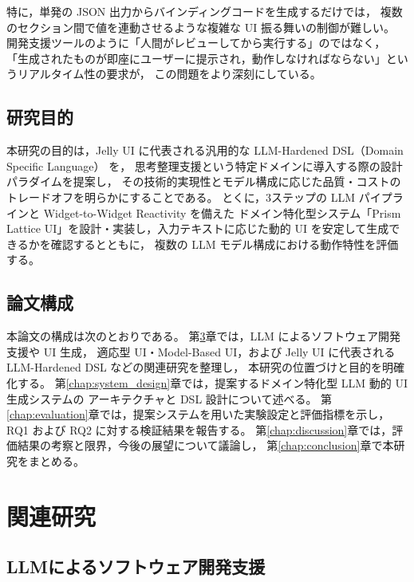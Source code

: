\documentclass[senior,final,11pt,dvipdfmx]{iputit-thesis}
\begin{document}
特に，単発の JSON 出力からバインディングコードを生成するだけでは，
複数のセクション間で値を連動させるような複雑な UI 振る舞いの制御が難しい。
開発支援ツールのように「人間がレビューしてから実行する」のではなく，
「生成されたものが即座にユーザーに提示され，動作しなければならない」というリアルタイム性の要求が，
この問題をより深刻にしている。

\section{研究目的}

本研究の目的は，Jelly UI に代表される汎用的な LLM-Hardened DSL（Domain Specific Language） を，
思考整理支援という特定ドメインに導入する際の設計パラダイムを提案し，
その技術的実現性とモデル構成に応じた品質・コストのトレードオフを明らかにすることである。
とくに，3ステップの LLM パイプラインと Widget-to-Widget Reactivity を備えた
ドメイン特化型システム「Prism Lattice UI」を設計・実装し，入力テキストに応じた動的 UI を安定して生成できるかを確認するとともに，
複数の LLM モデル構成における動作特性を評価する。

\section{論文構成}

本論文の構成は次のとおりである。
第\ref{chap:related_work}章では，LLM によるソフトウェア開発支援や UI 生成，
適応型 UI・Model-Based UI，および Jelly UI に代表される LLM-Hardened DSL などの関連研究を整理し，
本研究の位置づけと目的を明確化する。
第\ref{chap:system_design}章では，提案するドメイン特化型 LLM 動的 UI 生成システムの
アーキテクチャと DSL 設計について述べる。
第\ref{chap:evaluation}章では，提案システムを用いた実験設定と評価指標を示し，
RQ1 および RQ2 に対する検証結果を報告する。
第\ref{chap:discussion}章では，評価結果の考察と限界，今後の展望について議論し，
第\ref{chap:conclusion}章で本研究をまとめる。



\chapter{関連研究}
\label{chap:related_work}

\section{LLMによるソフトウェア開発支援}
\end{document}
